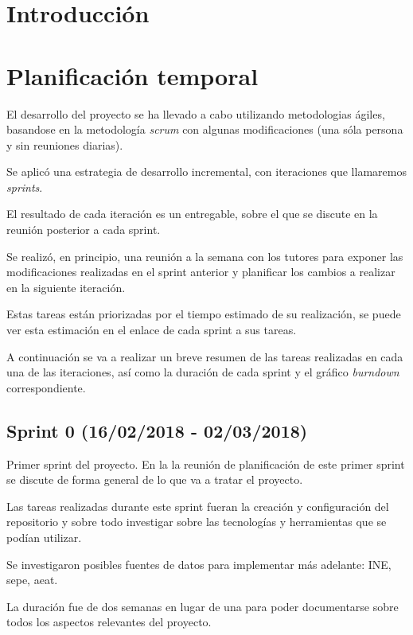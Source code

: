 
\section{Introducción}

\section{Planificación temporal}

El desarrollo del proyecto se ha llevado a cabo utilizando metodologias ágiles, basandose en la metodología \textit{scrum} con algunas modificaciones (una sóla persona y sin reuniones diarias).

Se aplicó una estrategia de desarrollo incremental, con iteraciones que llamaremos \textit{sprints}.

El resultado de cada iteración es un entregable, sobre el que se discute en la reunión posterior a cada sprint.

Se realizó, en principio, una reunión a la semana con los tutores para exponer las modificaciones realizadas en el sprint anterior y planificar los cambios a realizar en la siguiente iteración. 

Estas tareas están priorizadas por el tiempo estimado de su realización, se puede ver esta estimación en el enlace de cada sprint a sus tareas. 

A continuación se va a realizar un breve resumen de las tareas realizadas en cada una de las iteraciones, así como la duración de cada sprint y el gráfico \textit{burndown} correspondiente.

\subsection{Sprint 0 (16/02/2018 - 02/03/2018)}

Primer sprint del proyecto. En la la reunión de planificación de este primer sprint se discute de forma general de lo que va a tratar el proyecto. 

Las tareas realizadas durante este sprint fueran la creación y configuración del repositorio y sobre todo investigar sobre las tecnologías y herramientas que se podían utilizar.

Se investigaron posibles fuentes de datos para implementar más adelante: INE, sepe, aeat.

La duración fue de dos semanas en lugar de una para poder documentarse sobre todos los aspectos relevantes del proyecto.

